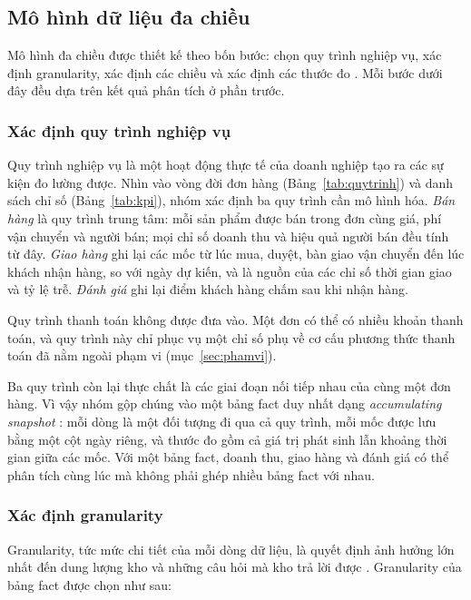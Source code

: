 \subsection{Mô hình dữ liệu đa chiều}

Mô hình đa chiều được thiết kế theo bốn bước: chọn quy trình nghiệp vụ, xác định granularity, xác định các chiều và xác định các thước đo \cite{kimball}. Mỗi bước dưới đây đều dựa trên kết quả phân tích ở phần trước.

\subsubsection{Xác định quy trình nghiệp vụ}

Quy trình nghiệp vụ là một hoạt động thực tế của doanh nghiệp tạo ra các sự kiện đo lường được. Nhìn vào vòng đời đơn hàng (Bảng~\ref{tab:quytrinh}) và danh sách chỉ số (Bảng~\ref{tab:kpi}), nhóm xác định ba quy trình cần mô hình hóa. \textit{Bán hàng} là quy trình trung tâm: mỗi sản phẩm được bán trong đơn cùng giá, phí vận chuyển và người bán; mọi chỉ số doanh thu và hiệu quả người bán đều tính từ đây. \textit{Giao hàng} ghi lại các mốc từ lúc mua, duyệt, bàn giao vận chuyển đến lúc khách nhận hàng, so với ngày dự kiến, và là nguồn của các chỉ số thời gian giao và tỷ lệ trễ. \textit{Đánh giá} ghi lại điểm khách hàng chấm sau khi nhận hàng.

Quy trình thanh toán không được đưa vào. Một đơn có thể có nhiều khoản thanh toán, và quy trình này chỉ phục vụ một chỉ số phụ về cơ cấu phương thức thanh toán đã nằm ngoài phạm vi (mục~\ref{sec:phamvi}).

Ba quy trình còn lại thực chất là các giai đoạn nối tiếp nhau của cùng một đơn hàng. Vì vậy nhóm gộp chúng vào một bảng fact duy nhất dạng \textit{accumulating snapshot} \cite{kimball}: mỗi dòng là một đối tượng đi qua cả quy trình, mỗi mốc được lưu bằng một cột ngày riêng, và thước đo gồm cả giá trị phát sinh lẫn khoảng thời gian giữa các mốc. Với một bảng fact, doanh thu, giao hàng và đánh giá có thể phân tích cùng lúc mà không phải ghép nhiều bảng fact với nhau.

\subsubsection{Xác định granularity}\label{sec:granularity}

Granularity, tức mức chi tiết của mỗi dòng dữ liệu, là quyết định ảnh hưởng lớn nhất đến dung lượng kho và những câu hỏi mà kho trả lời được \cite{inmon}. Granularity của bảng fact được chọn như sau:

